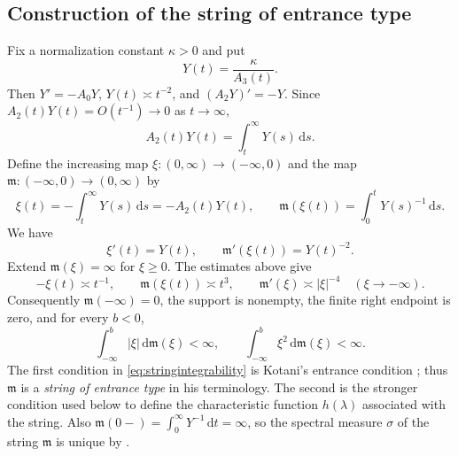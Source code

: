 \documentclass[11pt,letterpaper,reqno]{amsart}
\numberwithin{equation}{section}
\theoremstyle{plain}
\theoremstyle{remark}
\newcommand{\dd}{\,\mathrm d}
\begin{document}
\subsection{Construction of the string of entrance type}
Fix a normalization constant $\kappa>0$ and put
\begin{equation*}
 Y(t)=\frac{\kappa}{A_3(t)}.
\end{equation*}
Then $Y'=-A_0Y$, $Y(t)\asymp t^{-2}$, and $(A_2Y)'=-Y$. Since $A_2(t)Y(t)=O(t^{-1})\to0$ as $t\to\infty$,
\[
 A_2(t)Y(t)=\int_t^\infty Y(s)\dd s.
\]
Define the increasing map $\xi:(0,\infty)\to(-\infty,0)$ and the map $\mathfrak m:(-\infty,0)\to(0,\infty)$ by
\begin{equation*}
 \xi(t)=-\int_t^\infty Y(s)\dd s=-A_2(t)Y(t),\qquad
 \mathfrak m(\xi(t))=\int_0^tY(s)^{-1}\dd s.
\end{equation*}
We have
\begin{equation*}
 \xi'(t)=Y(t),\qquad \mathfrak m'(\xi(t))=Y(t)^{-2}.
\end{equation*}
Extend $\mathfrak m(\xi)=\infty$ for $\xi\ge0$. The estimates above give
\[
 -\xi(t)\asymp t^{-1},\qquad \mathfrak m(\xi(t))\asymp t^3,
 \qquad \mathfrak m'(\xi)\asymp|\xi|^{-4}\quad(\xi\to-\infty).
\]
Consequently $\mathfrak m(-\infty)=0$, the support is nonempty, the finite right endpoint is zero, and for every $b<0$,
\begin{equation}\label{eq:stringintegrability}
 \int_{-\infty}^b|\xi|\dd\mathfrak m(\xi)<\infty,
 \qquad \int_{-\infty}^b\xi^2\dd\mathfrak m(\xi)<\infty.
\end{equation}
The first condition in \eqref{eq:stringintegrability} is Kotani's entrance condition \cite[Condition~(2.1)]{Kotani}; thus $\mathfrak m$ is a \emph{string of entrance type} in his terminology. The second is the stronger condition used below to define the characteristic function $h(\lambda)$ associated with the string. Also $\mathfrak m(0-)=\int_0^\infty Y^{-1}\dd t=\infty$, so the spectral measure $\sigma$ of the string $\mathfrak{m}$ is unique by \cite[equation (2.3)]{Kotani}.
\end{document}
